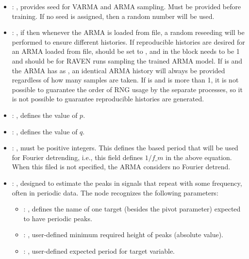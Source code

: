\begin{itemize}
    \item {}: , 
      provides seed for VARMA and ARMA sampling.
      Must be provided before training. If no seed is assigned,
      then a random number will be used.

    \item {}: , 
      if  then whenever the ARMA is loaded from file, a
      random reseeding will be performed to ensure different histories. \nb If
      reproducible histories are desired for an ARMA loaded from file,
       should be set to , and in the
       block  needs to be 1
      and  should be
       for RAVEN runs sampling the trained ARMA model.
      If  is  and the ARMA has
       as , an identical ARMA history
      will always be provided regardless of how many samples are taken.
      If  is  and 
      is more than 1, it is not possible to guarantee the order of RNG usage by
      the separate processes, so it is not possible to guarantee reproducible
      histories are generated.

    \item {}: , 
      defines the value of $p$.

    \item {}: , 
      defines the value of $q$.

    \item {}: , 
      must be positive integers. This defines the
      based period that will be used for Fourier detrending, i.e., this
      field defines $1/f\_m$ in the above equation.
      When this filed is not specified, the ARMA considers no Fourier detrend.

    \item {}: , 
      designed to estimate the peaks in signals that repeat with some frequency,
      often in periodic data.
      The  node recognizes the following parameters:
        \begin{itemize}
          \item {}: , 
            defines the name of one target (besides the                         pivot parameter)
            expected to have periodic peaks.
          \item {}: , 
            user-defined minimum required                         height of peaks (absolute value).
          \item {}: , 
            user-defined expected period for target variable.
      \end{itemize}


\end{itemize}
